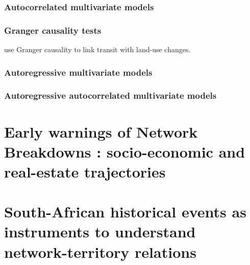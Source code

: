 \subsubsection{Autocorrelated multivariate models}

\subsubsection{Granger causality tests}

\cite{xie2009streetcars} use Granger causality to link transit with land-use changes.


\subsubsection{Autoregressive multivariate models}



\subsubsection{Autoregressive autocorrelated multivariate models}












\section{Early warnings of Network Breakdowns : socio-economic and real-estate trajectories}


















\section{South-African historical events as instruments to understand network-territory relations}








